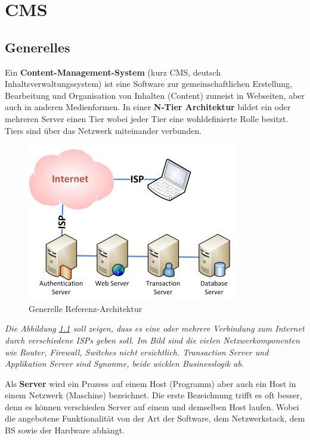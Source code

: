 \chapter{CMS}

\section{Generelles}
Ein \textbf{Content-Management-System} (kurz CMS, deutsch Inhaltsverwaltungssystem) ist eine Software zur gemeinschaftlichen Erstellung, Bearbeitung und Organisation von Inhalten (Content) zumeist in Webseiten, aber auch in anderen Medienformen.
In einer \textbf{N-Tier Architektur} bildet ein oder mehreren Server einen Tier wobei jeder Tier eine wohldefinierte Rolle besitzt. Tiers sind über das Netzwerk miteinander verbunden.

\begin{figure}[h!]
\centering
\includegraphics[width=0.7\linewidth]{fig/cms-generelle-referenz-architektur}
\caption{Generelle Referenz-Architektur}
\label{fig:cms-generelle-referenz-architektur}
\end{figure}

\emph{Die Abbildung \ref{fig:cms-generelle-referenz-architektur} soll zeigen, dass es eine oder mehrere Verbindung zum Internet durch verschiedene ISPs geben soll. Im Bild sind die vielen Netzwerkomponenten wie Router, Firewall, Switches nicht ersichtlich. Transaction Server und Applikation Server sind Synonme, beide wicklen Businesslogik ab.}

Als \textbf{Server} wird ein Prozess auf einem Host (Programm) aber auch ein Host in einem Netzwerk (Maschine) bezeichnet. Die erste Bezeichnung trifft es oft besser, denn es können verschieden Server auf einem und demselben Host laufen. Wobei die angebotene Funktionalität von der Art der Software, dem Netzwerkstack, dem BS sowie der Hardware abhängt.

